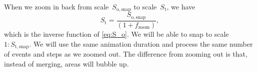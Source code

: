 \documentclass[twocolumn]{svjour3}          %
\begin{document}
When we zoom in back from scale~$S_\mathrm{o,snap}$ to scale~$S_\mathrm{t}$, 
we have
\begin{equation*}
\label{eq:S_i}
S_\mathrm{t} = \frac{S_\mathrm{o,snap}}{(1 + f_\mathrm{zoom})},
\end{equation*}
which is the inverse function of \eq\ref{eq:S_o}.
We will be able to snap to scale~$1:S_\mathrm{t,snap}$.
We will use the same animation duration and 
process the same number of events and steps as we zoomed out.
The difference from zooming out is that, instead of merging, 
areas will bubble up.


%
%
%
%
%
%
%
%

%
%
%
\end{document}
